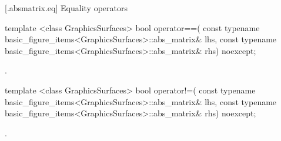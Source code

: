  [\iotwod.absmatrix.eq] {Equality operators}%

%
\begin{itemdecl}
template <class GraphicsSurfaces>
bool operator==(
  const typename basic_figure_items<GraphicsSurfaces>::abs_matrix& lhs,
  const typename basic_figure_items<GraphicsSurfaces>::abs_matrix& rhs)
  noexcept;
\end{itemdecl}
\begin{itemdescr}
\pnum
\returns {}.
\end{itemdescr}

%
\begin{itemdecl}
template <class GraphicsSurfaces>
bool operator!=(
  const typename basic_figure_items<GraphicsSurfaces>::abs_matrix& lhs,
  const typename basic_figure_items<GraphicsSurfaces>::abs_matrix& rhs)
  noexcept;
\end{itemdecl}
\begin{itemdescr}
\pnum
\returns {}.
\end{itemdescr}
